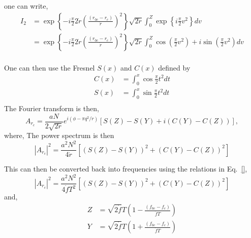 one can write,
\begin{equation}
\begin{split}
I_2 & = \exp{\left\{  - i \frac{\pi}{2} 2 \dot{r} \left(\frac{(r_{0c} - r_c)}{\dot{r}}\right)^2 \right\}} \sqrt{2\dot{r}}  \int_{0}^{Z} \exp{\left\{i \frac{\pi}{2} v^2\right\}} dv \\
& = \exp{\left\{  - i \frac{\pi}{2} 2 \dot{r} \left(\frac{(r_{0c} - r_c)}{\dot{r}}\right)^2 \right\}} \sqrt{2\dot{r}}  \int_{0}^{Z} 
\cos{\left(  \frac{\pi}{2} v^2 \right)} + i\sin{\left(  \frac{\pi}{2} v^2 \right)} dv \\
\end{split}
\end{equation}

One can then use the Fresnel $S(x)$ and $C(x)$ defined by
\begin{equation}
\begin{split}
C(x) &= \int_0^x \cos{\frac{\pi}{2} t^2} dt \\
S(x) &= \int_0^x \sin{\frac{\pi}{2} t^2} dt \\
\end{split}
\end{equation}
The Fourier transform is then,
\begin{equation}
A_{r_c} = \frac{aN}{2\sqrt{2\dot{r}}} e^{i(\phi - \pi q^2/\dot{r})} \left[ S(Z) -  S(Y) + i(C(Y) - C(Z))   \right],
\end{equation}
where,
The power spectrum is then
\begin{equation}
|A_{r_c}|^2 = \frac{a^2 N^2}{4\dot{r}}  \left[ (S(Z) -  S(Y))^2 + (C(Y) - C(Z))^2   \right]
\end{equation}

This can then be converted back into frequencies using the relations in Eq.~\ref{},
\begin{equation}
\label{app1:power_fresnel}
|A_{r_c}|^2 = \frac{a^2 N^2}{4\dot{f}T^2}  \left[ (S(Z) -  S(Y))^2 + (C(Y) - C(Z))^2   \right]
\end{equation}
and,
\begin{equation}
\begin{split}
Z &= \sqrt{2\dot{f}}T\left( 1 - \frac{(f_{0c} - f_c)}{\dot{f}T}  \right) \\
Y &= \sqrt{2\dot{f}}T\left( 1 + \frac{(f_{0c} - f_c)}{\dot{f}T}  \right) \\
\end{split}
\end{equation}

